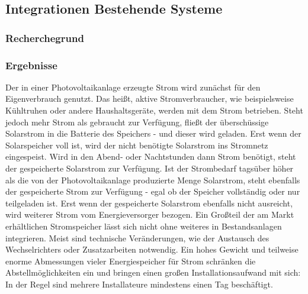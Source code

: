 \subsection{Integrationen Bestehende Systeme}

\subsubsection{Recherchegrund}


\subsubsection{Ergebnisse}

Der in einer Photovoltaikanlage erzeugte Strom wird zunächst für den Eigenverbrauch genutzt. Das heißt, aktive Stromverbraucher, wie beispielsweise Kühltruhen oder andere Haushaltsgeräte, werden mit dem Strom betrieben. Steht jedoch mehr Strom als gebraucht zur Verfügung, fließt der überschüssige Solarstrom in die Batterie des Speichers - und dieser wird geladen. Erst wenn der Solarspeicher voll ist, wird der nicht benötigte Solarstrom ins Stromnetz eingespeist.
Wird in den Abend- oder Nachtstunden dann Strom benötigt, steht der gespeicherte Solarstrom zur Verfügung. Ist der Strombedarf tagsüber höher als die von der Photovoltaikanlage produzierte Menge Solarstrom, steht ebenfalls der gespeicherte Strom zur Verfügung - egal ob der Speicher vollständig oder nur teilgeladen ist. Erst wenn der gespeicherte Solarstrom ebenfalls nicht ausreicht, wird weiterer Strom vom Energieversorger bezogen.
Ein Großteil der am Markt erhältlichen Stromspeicher lässt sich nicht ohne weiteres in Bestandsanlagen integrieren. Meist sind technische Veränderungen, wie der Austausch des Wechselrichters oder Zusatzarbeiten notwendig. Ein hohes Gewicht und teilweise enorme Abmessungen vieler Energiespeicher für Strom schränken die Abstellmöglichkeiten ein und bringen einen großen Installationsaufwand mit sich: In der Regel sind mehrere Installateure mindestens einen Tag beschäftigt.

